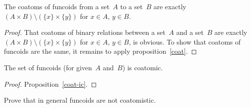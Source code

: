 \begin{thm}
The coatoms of funcoids from a set~$A$ to a set~$B$ are exactly
$(A\times B)\setminus(\{x\}\times\{y\})$ for $x\in A$, $y\in B$.\end{thm}
\begin{proof}
That coatoms of binary relations between a set~$A$ and a set~$B$
are exactly $(A\times B)\setminus(\{x\}\times\{y\})$ for $x\in A$,
$y\in B$, is obvious. To show that coatoms of funcoids are the same,
it remains to apply proposition~\ref{coat}.\end{proof}
\begin{thm}
The set of funcoids (for given~$A$ and~$B$) is coatomic.\end{thm}
\begin{proof}
Proposition~\ref{coat-ic}.\end{proof}
\begin{xca}
Prove that in general funcoids are not coatomistic.\end{xca}

